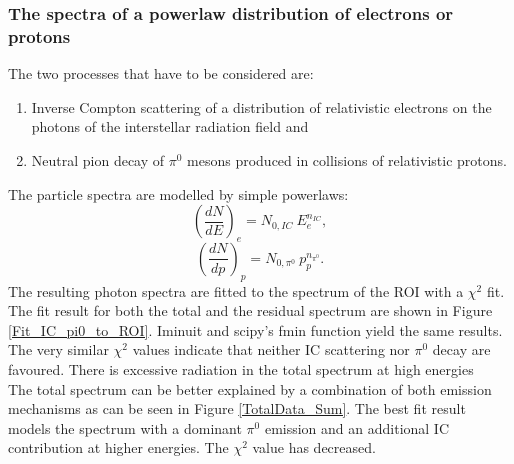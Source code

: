 \documentclass[a4paper]{article}
\begin{document}
\subsubsection{The spectra of a powerlaw distribution of electrons or protons}
The two processes that have to be considered are:
\begin{enumerate}
\item Inverse Compton scattering of a distribution of relativistic electrons on the photons of the interstellar radiation field and
\item Neutral pion decay of $\pi^0$ mesons produced in collisions of relativistic protons.
\end{enumerate}
The particle spectra are modelled by simple powerlaws:
$$\left(\frac{dN}{dE}\right)_e = N_{0,IC}\ E_e^{n_{IC}},$$ 
$$\left(\frac{dN}{dp}\right)_p = N_{0,\pi^0}\ p_p^{n_{\pi^0}}.$$
The resulting photon spectra are fitted to the spectrum of the ROI with a $\chi^2$ fit. The fit result for both the total and the residual spectrum are shown in Figure \ref{Fit_IC_pi0_to_ROI}. Iminuit and scipy's fmin function yield the same results. The very similar $\chi^2$ values indicate that neither IC scattering nor $\pi^0$ decay are favoured. There is excessive radiation in the total spectrum at high energies\\
The total spectrum can be better explained by a combination of both emission mechanisms as can be seen in Figure \ref{TotalData_Sum}. The best fit result models the spectrum with a dominant $\pi^0$ emission and an additional IC contribution at higher energies. The $\chi^2$ value has decreased.
\end{document}
